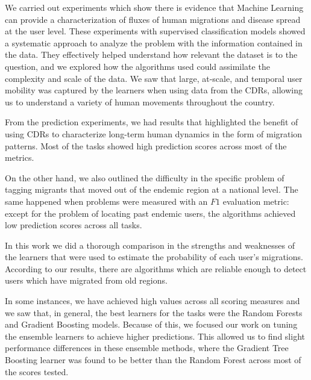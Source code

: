 
We carried out experiments which show there is evidence that Machine Learning can provide a characterization of fluxes of human migrations and disease spread at the user level.
These experiments with supervised classification models showed a systematic approach to analyze the problem with the information contained in the data.
They effectively helped understand how relevant the dataset is to the question, and we explored how the algorithms used could assimilate the complexity and scale of the data.
We saw that large, at-scale, and temporal user mobility was captured by the learners when using data from the CDRs, allowing us to understand a variety of human movements throughout the country.


From the prediction experiments, we had results that highlighted the benefit of using CDRs to characterize long-term human dynamics in the form of migration patterns.
Most of the tasks showed high prediction scores across most of the metrics.

On the other hand, we also outlined the difficulty in the specific problem of tagging migrants that moved out of the endemic region at a national level.
The same happened when problems were measured with an $F1$ evaluation metric: except for the problem of locating past endemic users, the algorithms achieved low prediction scores across all tasks.


In this work we did a thorough comparison in the strengths and weaknesses of the learners that were used to estimate the probability of each user's migrations.
According to our results, there are algorithms which are reliable enough to detect users which have migrated from old regions.

In some instances, we have achieved high values across all scoring measures and we saw that, in general, the best learners for the tasks were the Random Forests and Gradient Boosting models.
Because of this, we focused our work on tuning the ensemble learners to achieve higher predictions.
This allowed us to find slight performance differences in these ensemble methods, where the Gradient Tree Boosting learner was found to be better than the Random Forest across most of the scores tested.

